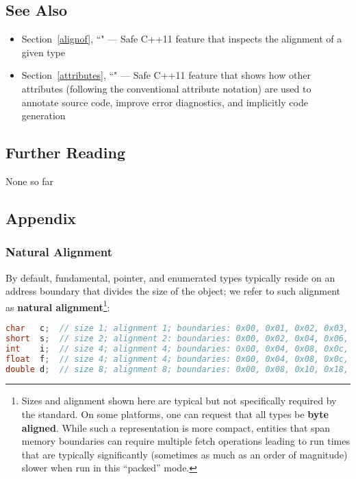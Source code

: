 \subsection[See Also]{See Also}\label{see-also}

\begin{itemize}
\item{Section~\ref{alignof}, ``" — Safe C++11 feature that inspects the alignment of a given type}
\item{Section~\ref{attributes}, ``" — Safe C++11 feature that shows how other attributes (following the conventional attribute notation) are used to annotate source code, improve error diagnostics, and implicitly code generation} %
\end{itemize}

\subsection[Further Reading]{Further Reading}\label{further-reading}

None so far

\subsection[Appendix]{Appendix}\label{alignas-appendix}

\subsubsection[Natural Alignment]{Natural Alignment}\label{natural-alignment}

By default, fundamental, pointer, and enumerated types typically reside
on an address boundary that divides the size of the object; we refer to
such alignment as \textbf{natural alignment}{\cprotect\footnote{Sizes
and alignment shown here are typical but not specifically required by
the standard. On some platforms, one can request that all
types be \textbf{byte aligned}. While such a representation is more
compact, entities that span memory boundaries can require multiple
fetch operations leading to run times that are typically
significantly (sometimes as much as an order of magnitude) slower when
  run in this ``packed'' mode.}}:

\begin{lstlisting}[language=C++]
char   c;  // size 1; alignment 1; boundaries: 0x00, 0x01, 0x02, 0x03, ...
short  s;  // size 2; alignment 2: boundaries: 0x00, 0x02, 0x04, 0x06, ...
int    i;  // size 4; alignment 4; boundaries: 0x00, 0x04, 0x08, 0x0c, ...
float  f;  // size 4; alignment 4; boundaries: 0x00, 0x04, 0x08, 0x0c, ...
double d;  // size 8; alignment 8; boundaries: 0x00, 0x08, 0x10, 0x18, ...
\end{lstlisting}
    
